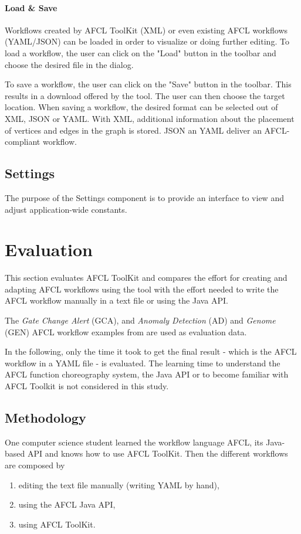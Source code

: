 \documentclass[a4paper,top=25mm,bottom=25mm,12pt,pdftex,halfparskip,twoside,bibtotoc,numbers=noenddot]{scrbook}
\begin{document}
\subsubsection{Load \& Save}

Workflows created by AFCL ToolKit (XML) or even existing AFCL workflows (YAML/JSON) can be loaded in order to visualize or doing further editing. To load a workflow, the user can click on the "Load" button in the toolbar and choose the desired file in the dialog.

To save a workflow, the user can click on the "Save" button in the toolbar.
This results in a download offered by the tool. The user can then choose the target location.  When saving a workflow, the desired format can be selected out of XML, JSON or YAML. With XML, additional information about the placement of vertices and edges in the graph is stored. JSON an YAML deliver an AFCL-compliant workflow.

\section{Settings}

The purpose of the Settings component is to provide an interface to view and adjust application-wide constants. 


\chapter{Evaluation}

This section evaluates AFCL ToolKit and compares the effort for creating and adapting AFCL workflows using the tool with the effort needed to write the AFCL workflow manually in a text file or using the Java API.

The \textit{Gate Change Alert}  (GCA), and \textit{Anomaly Detection} (AD) and \textit{Genome} (GEN) AFCL workflow examples from \citep{online-afcl-dps} are used as evaluation data.

In the following, only the time it took to get the final result - which is the AFCL workflow in a YAML file - is evaluated.
The learning time to understand the AFCL function choreography system, the Java API or to become familiar with AFCL Toolkit is not considered in this study.

\section{Methodology}

One computer science student learned the workflow language AFCL, its Java-based API and knows how to use AFCL ToolKit.
Then the different workflows are composed by
\begin{enumerate}[label={(\arabic*)}]
	\item editing the text file manually (writing YAML by hand),
	\item using the AFCL Java API,
	\item using AFCL ToolKit.
\end{enumerate}
\end{document}
